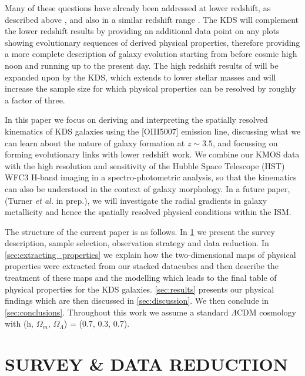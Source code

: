 \documentclass[a4paper,fleqn,usenatbib]{mn2e}
\begin{document}
Many of these questions have already been addressed at lower redshift, as described above \citep{ForsterSchreiber2009,Wisnioski2015,Stott2016}, and also in a similar redshift range \cite{Gnerucci2011}.
The KDS will complement the lower redshift results by providing an additional data point on any plots showing evolutionary sequences of derived physical properties, therefore providing a more complete description of galaxy evolution starting from before cosmic high noon and running up to the present day.
The high redshift results of \cite{Gnerucci2011} will be expanded upon by the KDS, which extends to lower stellar masses and will increase the sample size for which physical properties can be resolved by roughly a factor of three.

In this paper we focus on deriving and interpreting the spatially resolved kinematics of KDS galaxies using the [OIII5007] emission line, discussing what we can learn about the nature of galaxy formation at $z \sim 3.5$, and focussing on forming evolutionary links with lower redshift work.
We combine our KMOS data with the high resolution and sensitivity of the Hubble Space Telescope (HST) WFC3 H-band imaging in a spectro-photometric analysis, so that the kinematics can also be understood in the context of galaxy morphology.
In a future paper, (Turner \textit{et al.} in prep.), we will investigate the radial gradients in galaxy metallicity and hence the spatially resolved physical conditions within the ISM.

The structure of the current paper is as follows. In \cref{sec:Survey_and_data} we present the survey description, sample selection, observation strategy and data reduction.
In \cref{sec:extracting_properties} we explain how the two-dimensional maps of physical properties were extracted from our stacked datacubes and then describe the treatment of these maps and the modelling which leads to the final table of physical properties for the KDS galaxies. 
\cref{sec:results} presents our physical findings which are then discussed in \cref{sec:discussion}.
We then conclude in \cref{sec:conclusions}.
Throughout this work we assume a standard $\Lambda$CDM cosmology with (h, $\Omega_{m}$, $\Omega_{\Lambda}$) = (0.7, 0.3, 0.7). 

\section{SURVEY \& DATA REDUCTION}\label{sec:Survey_and_data}

\end{document}
